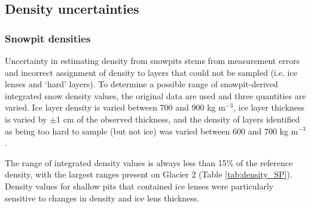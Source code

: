 \documentclass{sfuthesis}
\begin{document}
\subsection{Density uncertainties}

\subsubsection{Snowpit densities}

Uncertainty in estimating density from snowpits stems from measurement errors and incorrect assignment of density to layers that could not be sampled (i.e. ice lenses and `hard' layers). To determine a possible range of snowpit-derived integrated snow density values, the original data are used and three quantities are varied. Ice layer density is varied between 700 and 900 kg m$^{-3}$, ice layer thickness is varied by $\pm$1 cm of the observed thickness, and the density of layers identified as being too hard to sample (but not ice) was varied between 600 and 700 kg m$^{-3}$. 

The range of integrated density values is always less than 15\% of the reference density, with the largest ranges present on Glacier 2 (Table \ref{tab:density_SP}). Density values for shallow pits that contained ice lenses were particularly sensitive to changes in density and ice lens thickness. 
\end{document}
